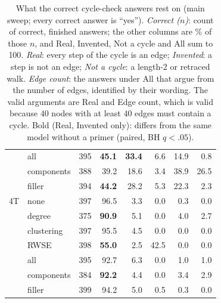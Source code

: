 \begin{table}[!t]
\begin{tabular}{llrrrrrr}
 & all & 395 & \textbf{45.1} & \textbf{33.4} & 6.6 & 14.9 & 0.8\\ %
 & components & 388 & 39.2 & 18.6 & 3.4 & 38.9 & 26.5\\ %
 & filler & 394 & \textbf{44.2} & 28.2 & 5.3 & 22.3 & 2.3\\ %
\addlinespace[2pt]
4T & none & 397 & 96.5 & 3.3 & 0.0 & 0.3 & 0.0\\ %
 & degree & 375 & \textbf{90.9} & 5.1 & 0.0 & 4.0 & 2.7\\ %
 & clustering & 397 & 95.5 & 4.5 & 0.0 & 0.0 & 0.0\\ %
 & RWSE & 398 & \textbf{55.0} & 2.5 & 42.5 & 0.0 & 0.0\\ %
 & all & 395 & 92.7 & 6.3 & 0.0 & 1.0 & 1.0\\ %
 & components & 384 & \textbf{92.2} & 4.4 & 0.0 & 3.4 & 2.9\\ %
 & filler & 399 & 94.2 & 5.0 & 0.5 & 0.3 & 0.0\\ %
\bottomrule
\end{tabular}
\caption{What the correct cycle-check answers rest on (main sweep; every correct answer is ``yes''). \emph{Correct ($n$)}: count of correct, finished answers; the other columns are \% of those $n$, and Real, Invented, Not a cycle and All sum to 100. \emph{Real}: every step of the cycle is an edge; \emph{Invented}: a step is not an edge; \emph{Not a cycle}: a length-2 or retraced walk. \emph{Edge count}: the answers under All that argue from the number of edges, identified by their wording. The valid arguments are Real and Edge count, which is valid because $40$ nodes with at least $40$ edges must contain a cycle. Bold (Real, Invented only): differs from the same model without a primer (paired, BH $q<.05$).} %
\label{tab:cycles}
\end{table}
